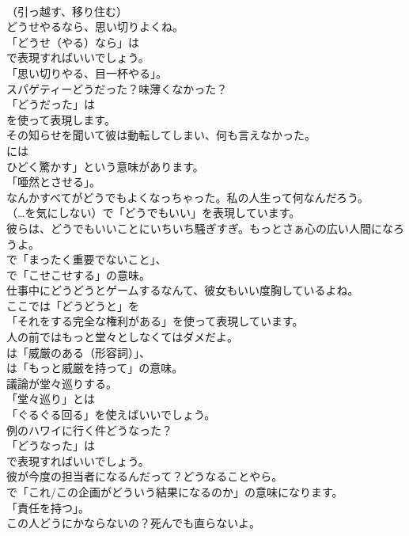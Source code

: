 \documentclass[8pt]{extreport}
\begin{document}
\begin{CJK}{UTF8}{min}
\\	（引っ越す、移り住む）	
\\	どうせやるなら、思い切りよくね。 
\\	「どうせ（やる）なら」は
\\	で表現すればいいでしょう。
\\	「思い切りやる、目一杯やる」。	
\\	スパゲティーどうだった？味薄くなかった？ 
\\	「どうだった」は
\\	を使って表現します。	
\\	その知らせを聞いて彼は動転してしまい、何も言えなかった。 
\\	には
\\	ひどく驚かす」という意味があります。
\\	「唖然とさせる」。	
\\	なんかすべてがどうでもよくなっちゃった。私の人生って何なんだろう。 
\\	（…を気にしない）で「どうでもいい」を表現しています。	
\\	彼らは、どうでもいいことにいちいち騒ぎすぎ。もっとさぁ心の広い人間になろうよ。 
\\	で「まったく重要でないこと」、
\\	で「こせこせする」の意味。	
\\	仕事中にどうどうとゲームするなんて、彼女もいい度胸しているよね。 
\\	ここでは「どうどうと」を
\\	「それをする完全な権利がある」を使って表現しています。	
\\	人の前ではもっと堂々としなくてはダメだよ。 
\\	は「威厳のある（形容詞）」、
\\	は「もっと威厳を持って」の意味。	
\\	議論が堂々巡りする。 
\\	「堂々巡り」とは
\\	「ぐるぐる回る」を使えばいいでしょう。	
\\	例のハワイに行く件どうなった？ 
\\	「どうなった」は 
\\	で表現すればいいでしょう。	
\\	彼が今度の担当者になるんだって？どうなることやら。 
\\	で「これ/この企画がどういう結果になるのか」の意味になります。
\\	「責任を持つ」。	
\\	この人どうにかならないの？死んでも直らないよ。 

\end{CJK}
\end{document}
